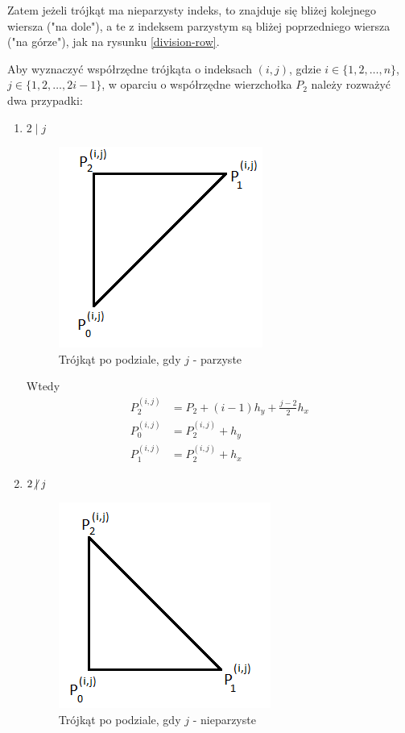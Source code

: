 \documentclass[12pt]{article}
\begin{document}
	Zatem jeżeli trójkąt ma nieparzysty indeks, to znajduje się bliżej kolejnego wiersza ("na dole"), a te z indeksem parzystym są bliżej poprzedniego wiersza ("na górze"), jak na rysunku \ref{division-row}.
	
	Aby wyznaczyć współrzędne trójkąta o indeksach $(i, j)$, gdzie $i \in \{1, 2, \dots, n\}$, $j \in \{1, 2, \dots, 2i-1\}$, w oparciu o współrzędne wierzchołka $P_2$ należy rozważyć dwa przypadki:
	
	\begin{enumerate}[label=\textbf{\Roman*}]
		\item $2 \mid j$
		
		\begin{figure}[H]
			\centering
			\includegraphics[]{images/triangle-j-even.png}
			\caption{Trójkąt po podziale, gdy $j$ - parzyste}
			\label{triangle-j-even}
		\end{figure}
		
		Wtedy
		\begin{align*}
			P_2^{(i,j)} & = P_2 + (i-1)h_y + \frac{j-2}{2}h_x \\
			P_0^{(i,j)} & = P_2^{(i,j)} + h_y                   \\
			P_1^{(i,j)} & = P_2^{(i,j)} + h_x
		\end{align*}
		
		
		\pagebreak
		
		\item $2 \centernot\mid j$
		
		\begin{figure}[H]
			\centering
			\includegraphics[]{images/triangle-j-odd.png}
			\caption{Trójkąt po podziale, gdy $j$ - nieparzyste}
			\label{triangle-j-odd}
		\end{figure}
		

\end{enumerate}
\end{document}
